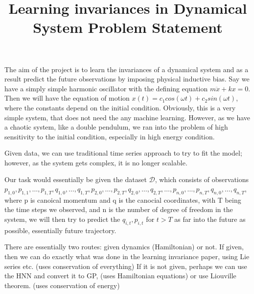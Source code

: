 \documentclass{article}
\title{\vspace{-3cm}Learning invariances in Dynamical System Problem Statement\vspace{-3em}}
\author{}
\date{}
\begin{document}
\maketitle
The aim of the project is to learn the invariances of a dynamical system and as a result predict the future observations by imposing physical inductive bias.  
Say we have a simply simple harmonic oscillator with the defining equation $m\ddot{x} + kx = 0.$
Then we will have the equation of motion $x(t) = c_1cos(\omega t) +c_2sin(\omega t)$, where the constants depend on the initial condition. 
Obviously, this is a very simple system, that does not need the any machine learning. 
However, as we have a chaotic system, like a double pendulum, we ran into the problem of high sensitivity to the initial condition, especially in high energy condition. 

Given data, we can use traditional time series approach to try to fit the model; however, as the system gets complex, it is no longer scalable. 

Our task would essentially be given the dataset $\mathcal{D}$, which consists of observations $p_{1,0}, p_{1,1}, \dots, p_{1,T}, q_{1,0}, \dots, q_{1,T}, p_{2,0}, \dots, p_{2,T}, q_{2,0}, \dots, q_{2,T}, \dots, p_{n,0}, \dots, p_{n,T}, q_{n,0}, \dots, q_{n,T}$, where p is canoical momentum and q is the canocial coordinates, with T being the time steps we observed, and n is the number of degree of freedom in the system, 
we will then try to predict the $q_{i,t}, p_{i,t}$ for $t>T$ as far into the future as possible, essentially future trajectory. 

There are essentially two routes: given dynamics (Hamiltonian) or not. 
If given, then we can do exactly what was done in the learning invariance paper, using Lie series etc. (uses conservation of everything)
If it is not given, perhaps we can use the HNN and convert it to GP, (uses Hamiltonian equations)
or use Liouville theorem. (uses conservation of energy)
\end{document}
